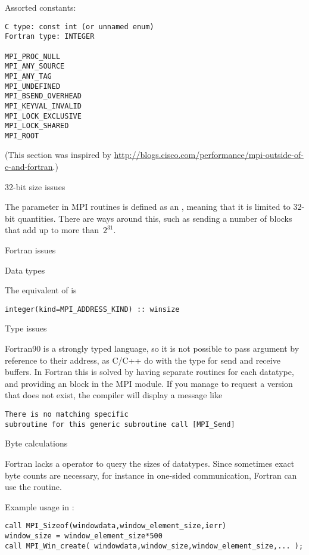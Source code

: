 Assorted constants:
\begin{lstlisting}
C type: const int (or unnamed enum)
Fortran type: INTEGER

MPI_PROC_NULL
MPI_ANY_SOURCE
MPI_ANY_TAG
MPI_UNDEFINED
MPI_BSEND_OVERHEAD
MPI_KEYVAL_INVALID                
MPI_LOCK_EXCLUSIVE
MPI_LOCK_SHARED
MPI_ROOT
\end{lstlisting}

(This section was inspired by
\url{http://blogs.cisco.com/performance/mpi-outside-of-c-and-fortran}.)


 {32-bit size issues}

The  parameter in MPI routines is defined as an ,
meaning that it is limited to 32-bit quantities.  There are ways
around this, such as sending a number of
 blocks that add up to more than~$2^{31}$.

 {Fortran issues}
\label{sec:ref:mpi-fortran}

 {Data types}

The equivalent of  is
\lstset{language=Fortran} %
\begin{lstlisting}
integer(kind=MPI_ADDRESS_KIND) :: winsize
\end{lstlisting}

 {Type issues}

Fortran90 is a strongly typed language, so it is not possible to pass
argument by reference to their address, as C/C++ do with the 
type for send and receive buffers. In Fortran this is solved by having
separate routines for each datatype, and providing an  block
in the MPI module. If you manage to request a version that does not exist,
the compiler will display a message like
\begin{verbatim}
There is no matching specific 
subroutine for this generic subroutine call [MPI_Send]
\end{verbatim}

 {Byte calculations}
\label{sec:f-sizeof}

Fortran lacks a  operator to query the sizes of datatypes.
Since sometimes exact byte counts are necessary,
for instance in one-sided communication,
Fortran can use the  routine.


Example usage in :
\begin{lstlisting}
call MPI_Sizeof(windowdata,window_element_size,ierr)
window_size = window_element_size*500
call MPI_Win_create( windowdata,window_size,window_element_size,... );
\end{lstlisting}
\lstset{language=C} %

